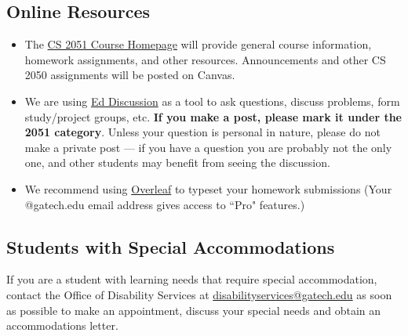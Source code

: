\documentclass{article}
\begin{document}
\subsection*{Online Resources}
    \begin{itemize}
        \item The \href{https://github.com/sar-mo/CS2051-HonorsDiscreteMath}{CS 2051 Course Homepage} will provide general course information, homework assignments, and other resources. Announcements and other CS 2050 assignments will be posted on Canvas.
        \item We are using \href{https://edstem.org/}{Ed Discussion} as a tool to ask questions, discuss problems, form study/project groups, etc. \textbf{If you make a post, please mark it under the 2051 category}. Unless your question is personal in nature, please do not make a private post — if you have a question you are probably not the only one, and other students may benefit from seeing the discussion.
        \item We recommend using \href{https://overleaf.com}{Overleaf} to typeset your homework submissions (Your @gatech.edu email address gives access to ``Pro" features.)
    \end{itemize}

\subsection*{Students with Special Accommodations}
If you are a student with learning needs that require special accommodation, contact the Office of Disability Services at \url{disabilityservices@gatech.edu} as soon as possible to make an appointment, discuss your special needs and obtain an accommodations letter.
\end{document}

